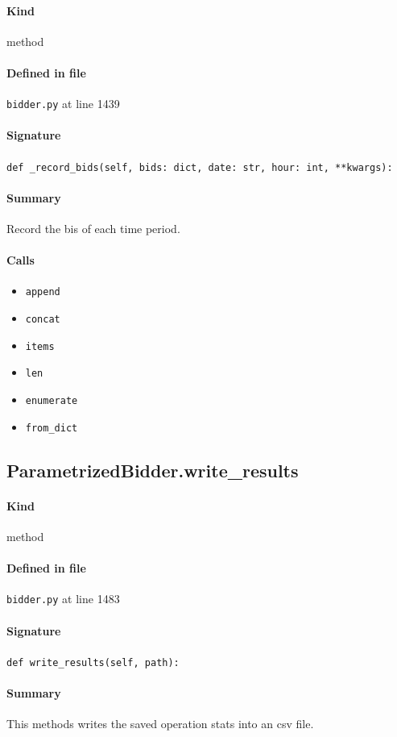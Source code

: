 \documentclass[11pt]{report}
\begin{document}
\paragraph{Kind} method
\paragraph{Defined in file} \texttt{bidder.py} at line 1439
\paragraph{Signature} \texttt{def \_record\_bids(self, bids: dict, date: str, hour: int, **kwargs):}
\paragraph{Summary} Record the bis of each time period.
\paragraph{Calls}
\begin{itemize}[leftmargin=*]
  \item \texttt{append}
  \item \texttt{concat}
  \item \texttt{items}
  \item \texttt{len}
  \item \texttt{enumerate}
  \item \texttt{from\_dict}
\end{itemize}
\subsection{ParametrizedBidder.write\_results}
\label{def:bidder.py:ParametrizedBidder.write_results:L1483}
\paragraph{Kind} method
\paragraph{Defined in file} \texttt{bidder.py} at line 1483
\paragraph{Signature} \texttt{def write\_results(self, path):}
\paragraph{Summary} This methods writes the saved operation stats into an csv file.
\end{document}
